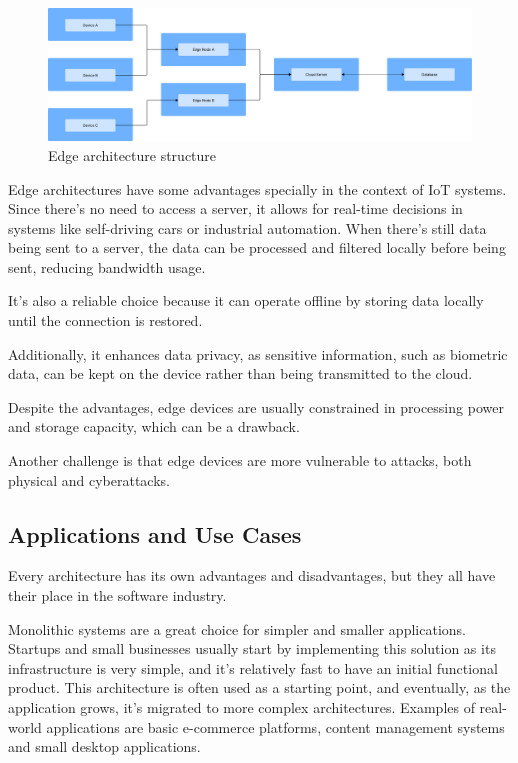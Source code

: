 \begin{figure}[H]
	\centering
	\includegraphics[width=\textwidth, height=0.5\textheight, keepaspectratio]{Chapters/Figures/Architectures/Edge.pdf}
	\caption{Edge architecture structure}
	\label{fig:architectures:edge}
\end{figure}

Edge architectures have some advantages specially in the context of IoT systems.
Since there's no need to access a server, it allows for real-time decisions
in systems like self-driving cars or industrial automation. When there's
still data being sent to a server, the data can be processed and filtered
locally before being sent, reducing bandwidth usage\cite{s20226441}.

It's also a reliable choice because it can operate offline by storing data
locally until the connection is restored\cite{MicrosoftEdgeComputing}.

Additionally, it enhances data privacy, as sensitive information, such as biometric data,
can be kept on the device rather than being transmitted to the cloud\cite{MicrosoftEdgeComputing}.

Despite the advantages, edge devices are usually constrained in processing power
and storage capacity, which can be a drawback\cite{s20226441}.

Another challenge is that edge devices are more vulnerable to attacks, both
physical and cyberattacks\cite{s20226441}.

\subsection{Applications and Use Cases}
Every architecture has its own advantages and disadvantages, but they all have
their place in the software industry.

Monolithic systems are a great choice for simpler and smaller applications.
Startups and small businesses usually start by implementing this solution as
its infrastructure is very simple, and it's relatively fast to have an initial
functional product. This architecture is often used as a starting point, and
eventually, as the application grows, it's migrated to more complex architectures.
Examples of real-world applications are basic e-commerce platforms, content
management systems and small desktop applications.

